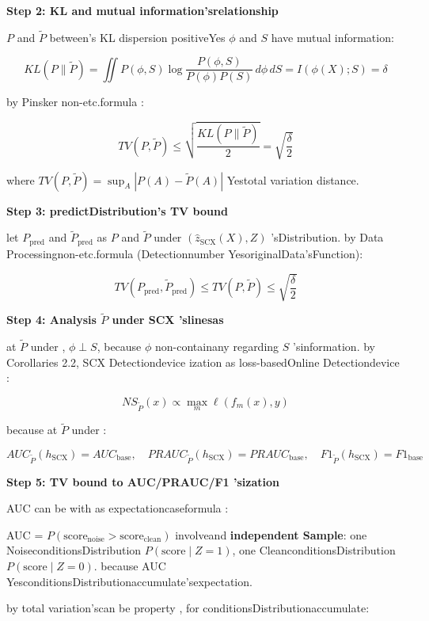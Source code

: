 \documentclass[
  12pt,
]{article}
\begin{document}
\textbf{Step 2: KL and mutual information'srelationship }

\(P\) and  \(\tilde{P}\) between's KL dispersion positiveYes \(\phi\) and  \(S\) have mutual information: 

\[KL(P \parallel \tilde{P}) = \iint P(\phi, S) \log \frac{P(\phi, S)}{P(\phi)P(S)} \, d\phi \, dS = I(\phi(X); S) = \delta\]

by  Pinsker non-etc.formula : 

\[TV(P, \tilde{P}) \leq \sqrt{\frac{KL(P \parallel \tilde{P})}{2}} = \sqrt{\frac{\delta}{2}}\]

where \(TV(P, \tilde{P}) = \sup_A |P(A) - \tilde{P}(A)|\) Yestotal variation distance. 

\textbf{Step 3: predictDistribution's TV bound }

let \(P_{\text{pred}}\) and  \(\tilde{P}_{\text{pred}}\) as  \(P\) and 
\(\tilde{P}\) under  \((\hat{z}_{\text{SCX}}(X), Z)\)
'sDistribution. by Data Processingnon-etc.formula (Detectionnumber YesoriginalData'sFunction):

\[TV(P_{\text{pred}}, \tilde{P}_{\text{pred}}) \leq TV(P, \tilde{P}) \leq \sqrt{\frac{\delta}{2}}\]

\textbf{Step 4: Analysis \(\tilde{P}\) under  SCX 'slinesas }

at  \(\tilde{P}\) under , \(\phi \perp S\), because  \(\phi\) non-containany regarding 
\(S\) 'sinformation. by Corollaries 2.2, SCX Detectiondevice ization as loss-basedOnline Detectiondevice : 

\[NS_{\tilde{P}}(x) \propto \max_m \ell(f_m(x), y)\]

because at  \(\tilde{P}\) under : 

\[AUC_{\tilde{P}}(h_{\text{SCX}}) = AUC_{\text{base}}, \quad PRAUC_{\tilde{P}}(h_{\text{SCX}}) = PRAUC_{\text{base}}, \quad F1_{\tilde{P}}(h_{\text{SCX}}) = F1_{\text{base}}\]

\textbf{Step 5: TV bound to  AUC/PRAUC/F1 'sization }

AUC can be with as expectationcaseformula : 

AUC = \(P(\text{score}_{\text{noise}} > \text{score}_{\text{clean}})\)
involveand \textbf{independent Sample}: one NoiseconditionsDistribution
\(P(\text{score} \mid Z=1)\), one CleanconditionsDistribution
\(P(\text{score} \mid Z=0)\). because  AUC YesconditionsDistributionaccumulate'sexpectation. 

by total variation'scan be property , for conditionsDistributionaccumulate: 
\end{document}
